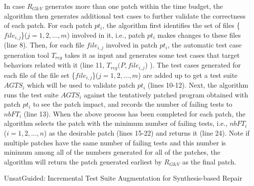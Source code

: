 \documentclass[]{sig-alternate}
\begin{document}
In case $R_{G\&V}$ generates more than one patch within the time budget, the algorithm then generates additional test cases to further validate the correctness of each patch. For each patch $pt_{i}$, the algorithm first identifies the set of files \{$file_{i,j}$\}($j=1, 2,\ldots, m$) involved in it, i.e., patch $pt_{i}$ makes changes to these files (line 8).
Then, for each file $file_{i,j}$ involved in patch $pt_{i}$, the automatic test case generation tool $T_{reg}$ takes it as input and generates some test cases that target behaviors related with it (line 11, $T_{reg}(P, file_{i,j}$)
). 
The test cases generated for each file of the file set \{$file_{i,j}$\}($j=1, 2,\ldots, m$) are added up to get a test suite $AGTS_i$ which will be used to validate patch $pt_{i}$ (lines 10-12).
Next, the algorithm runs the test suite $AGTS_i$ against the tentatively patched program obtained with patch $pt_{i}$ to see the patch impact, and records the number of failing tests to $nbFT_i$ (line 13). 
When the above process has been completed for each patch, the algorithm selects the patch with the minimum number of failing tests, i.e., $nbFT_i$ ($i=1, 2,\ldots, n$) as the desirable patch (lines 15-22) and returns it (line 24). 
Note if multiple patches have the same number of failing tests and this number is minimum among all of the numbers generated for all of the patches, the algorithm will return the patch generated earliest by $R_{G\&V}$ as the final patch. 



\begin{algorithm}[t]
\begin{algorithmic}[1]
\ELSE
    \ENDFOR
        \ELSE
        \ENDIF
    \ENDFOR
\ENDIF
{}
\end{algorithmic}
\caption{UnsatGuided: Incremental Test Suite Augmentation for Synthesis-based Repair}
\label{alg:2}
\end{algorithm}
\end{document}
